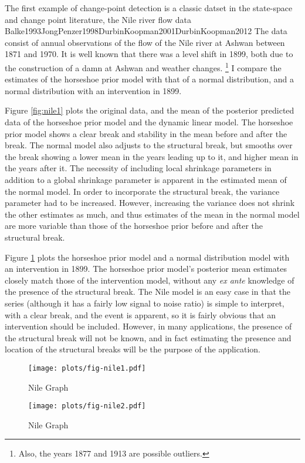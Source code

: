 \documentclass{article}
\begin{document}
The first example of change-point detection is a classic datset in the state-space and change point literature, the Nile river flow data \textcite{Cobb1978}{Balke1993}{JongPenzer1998}{DurbinKoopman2001}{DurbinKoopman2012}
The data consist of annual observations of the flow of the Nile river at Ashwan between 1871 and 1970.
It is well known that there was a level shift in 1899, both due to the construction of a damn at Ashwan and weather changes.
\footnote{Also, the years 1877 and 1913 are possible outliers.}
I compare the estimates of the horseshoe prior model with that of a normal distribution, and a normal distribution with an intervention in 1899.

Figure \ref{fig:nile1} plots the original data, and the mean of the posterior predicted data of the horseshoe prior model and the dynamic linear model.
The horseshoe prior model shows a clear break and stability in the mean before and after the break.
The normal model also adjusts to the structural break, but smooths over the break showing a lower mean in the years leading up to it, and higher mean in the years after it.
The necessity of including local shrinkage parameters in addition to a global shrinkage parameter is apparent in the estimated mean of the normal model.
In order to incorporate the structural break, the variance parameter had to be increased.
However, increasing the variance does not shrink the other estimates as much, and thus estimates of the mean in the normal model are more variable than those of the horseshoe prior before and after the structural break.

Figure \ref{fig:nile2} plots the horseshoe prior model and a normal distribution model with an intervention in 1899.
The horseshoe prior model's posterior mean estimates closely match those of the intervention model, without any \textit{ex ante} knowledge of the presence of the structural break.
The Nile model is an easy case in that the series (although it has a fairly low signal to  noise ratio) is simple to interpret, with a clear break, and the event is apparent, so it is fairly obvious that an intervention should be included.
However, in many applications, the presence of the structural break will not be known, and in fact estimating the presence and location of the structural breaks will be the purpose of the application.

\begin{figure}[htpb]
  \centering
  \texttt{[image: plots/fig-nile1.pdf]}  
  \caption{Nile Graph}
  \label{fig:nile1}

  \texttt{[image: plots/fig-nile2.pdf]}
  \caption{Nile Graph}
  \label{fig:nile2}
\end{figure}
\end{document}

